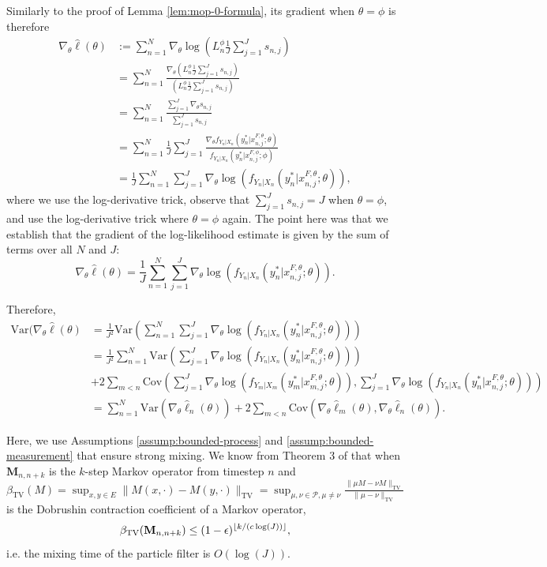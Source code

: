 \documentclass{article}
\begin{document}
Similarly to the proof of Lemma \ref{lem:mop-0-formula}, its gradient when $\theta=\phi$ is therefore 
\begin{align*}
    \nabla_\theta \hat{\ell}(\theta) &:= \sum_{n=1}^N \nabla_\theta \log\left(L_n^\phi \frac{1}{J} \sum_{j=1}^J s_{n,j}\right) \\
    &= \sum_{n=1}^N \frac{\nabla_\theta \left(L_n^\phi \frac{1}{J} \sum_{j=1}^J s_{n,j}\right)}{\left(L_n^\phi \frac{1}{J} \sum_{j=1}^J s_{n,j}\right)} \\
    &= \sum_{n=1}^N \frac{\sum_{j=1}^J \nabla_\theta s_{n,j}}{\sum_{j=1}^J s_{n,j}} \\
    &= \sum_{n=1}^N \frac{1}{J} \sum_{j=1}^J \frac{\nabla_\theta f_{Y_n|X_{n}}(y_n^*|x_{n,j}^{F, \theta}; \theta)}{f_{Y_n|X_{n}}(y_n^*|x_{n,j}^{F, \phi}; \phi)} \\
    &= \frac{1}{J} \sum_{n=1}^N \sum_{j=1}^J \nabla_\theta \log\left(f_{Y_n|X_{n}}(y_n^*|x_{n,j}^{F, \theta}; \theta)\right),
\end{align*}
where we use the log-derivative trick, observe that $\sum_{j=1}^J s_{n,j} = J$ when $\theta=\phi$, and use the log-derivative trick where $\theta=\phi$ again. The point here was that we establish that the gradient of the log-likelihood estimate is given by the sum of terms over all $N$ and $J$:
$$\nabla_\theta \hat{\ell}(\theta) = \frac{1}{J} \sum_{n=1}^N \sum_{j=1}^J \nabla_\theta \log\left(f_{Y_n|X_{n}}(y_n^*|x_{n,j}^{F, \theta}; \theta)\right).$$

Therefore,
\begin{align*}
    \text{Var}(\nabla_\theta \hat\ell(\theta) &= \frac{1}{J^2}\text{Var}\left(\sum_{n=1}^N\sum_{j=1}^{J}\nabla_\theta \log\left(f_{Y_n|X_{n}}(y_n^*|x_{n,j}^{F, \theta}; \theta)\right)\right) \\
    &= \frac{1}{J^2}\sum_{n=1}^N\text{Var}\left(\sum_{j=1}^{J}\nabla_\theta \log\left(f_{Y_n|X_{n}}(y_n^*|x_{n,j}^{F, \theta}; \theta)\right)\right) \\
    &+ 2\sum_{m<n}\text{Cov}\left(\sum_{j=1}^{J}\nabla_\theta \log\left(f_{Y_m|X_{m}}(y_m^*|x_{m,j}^{F, \theta}; \theta)\right), \sum_{j=1}^{J}\nabla_\theta \log\left(f_{Y_n|X_{n}}(y_n^*|x_{n,j}^{F, \theta}; \theta)\right)\right) \\
    &= \sum_{n=1}^N \text{Var}(\nabla_\theta\hat\ell_n(\theta)) + 2\sum_{m<n} \text{Cov}(\nabla_\theta\hat\ell_m(\theta),\nabla_\theta\hat\ell_n(\theta)).
\end{align*}

Here, we use Assumptions \ref{assump:bounded-process} and \ref{assump:bounded-measurement} that ensure strong mixing. We know from Theorem 3 of \cite{karjalainen2023} that when $\textbf{M}_{n,n+k}$ is the $k$-step Markov operator from timestep $n$ and $\beta_{\text{TV}}(M) = \sup _{x, y \in E}\|M(x, \cdot)-M(y, \cdot)\|_{\mathrm{TV}}=\sup _{\mu, \nu \in \mathcal{P}, \mu \neq \nu} \frac{\|\mu M-\nu M\|_{\mathrm{TV}}}{\|\mu-\nu\|_{\mathrm{TV}}}$ is the Dobrushin contraction coefficient of a Markov operator, 
$$\beta_{\text{TV}}(\textbf{M}_{n,n+k}) \leq (1-\epsilon)^{\lfloor k/(c\log(J)) \rfloor},$$
i.e. the mixing time of the particle filter is $O(\log(J))$. 
\end{document}
